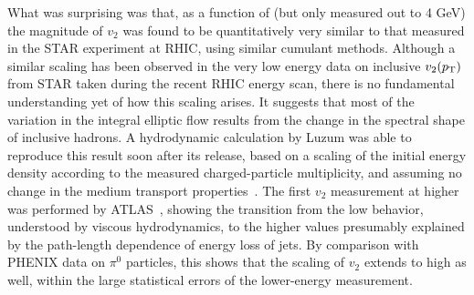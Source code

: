 What was surprising was that, as a function of \pT (but only measured out to 4 GeV)
the magnitude of $v_2$ was found to be quantitatively very similar to that measured in
the STAR experiment at RHIC, using similar cumulant methods.
Although a similar scaling has been observed in the very low energy 
data on inclusive $v_2(\mbox{$p_{\mathrm{T}}$})$ from STAR taken during the recent RHIC energy scan,
there is no fundamental understanding yet of how this scaling arises.
It suggests that most of the variation in the integral elliptic flow results from the change in the spectral shape
of inclusive hadrons.
A hydrodynamic calculation by Luzum was able to reproduce this result soon after its release, 
based on a scaling of the initial energy density according to the measured charged-particle
multiplicity, and assuming no change in the medium transport properties~\cite{Luzum:2010ag}.
The first $v_2$ measurement at higher \pT was performed by ATLAS~\cite{ATLAS:2011ah}, 
showing the transition from the low \pT behavior,
understood by viscous hydrodynamics, to the higher \pT values presumably explained by the path-length dependence of
energy loss of jets.
By comparison with PHENIX data on $\pi^0$ particles, this shows that the scaling of $v_2$ extends to high \pT as well,
within the large statistical errors of the lower-energy measurement.

